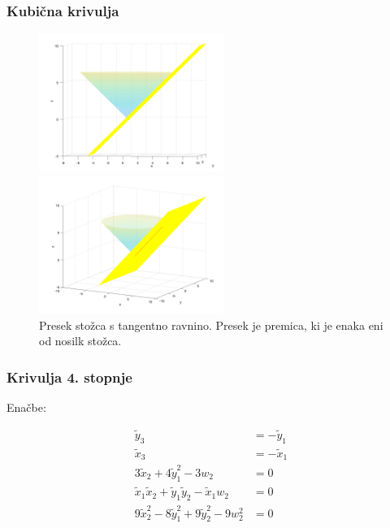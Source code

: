\documentclass[a4paper, 12pt]{beamer}
\theoremstyle{definition}
\theoremstyle{plain}
\begin{document}
    

\begin{frame}
    \frametitle{Kubična krivulja}
    
    \begin{figure}[ht!]
        \begin{minipage}{0.5\textwidth}
            \centering
            \includegraphics[width=60mm]{stozec_tang_1.png}
        \end{minipage}\hfill
        \begin{minipage}{0.5\textwidth}
            \centering
            \includegraphics[width=60mm]{stozec_tang_2.png}
        \end{minipage}\hfill
        \caption{Presek stožca s tangentno ravnino. Presek je premica, ki je enaka eni od nosilk stožca.}
    \end{figure}

    
\end{frame}
    
    

\begin{frame}
\frametitle{Krivulja 4. stopnje}
    Enačbe:

        \begin{align*}
            \tilde{y}_3 &=- \tilde{y}_1 \\
            \tilde{x}_3 &= - \tilde{x}_1 \\
            3\tilde{x}_2 + 4\tilde{y}_1^2 - 3w_2 &= 0 \\
            \tilde{x}_1\tilde{x}_2 + \tilde{y}_1\tilde{y}_2  - \tilde{x}_1w_2 &= 0 \\
            9\tilde{x}_2^2 - 8\tilde{y}_1^2 + 9\tilde{y}_2^2 - 9w_2^2&= 0 
        \end{align*}
\end{frame}
    
\end{document}
